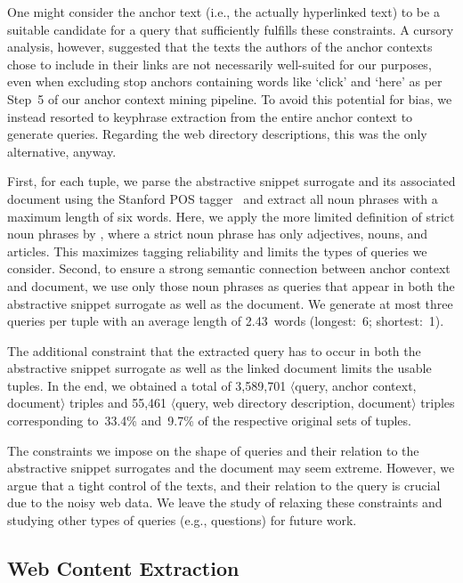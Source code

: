 \documentclass[sigconf]{acmart}
\begin{document}
One might consider the anchor text (i.e., the actually hyperlinked text) to be a suitable candidate for a query that sufficiently fulfills these constraints. A cursory analysis, however, suggested that the texts the authors of the anchor contexts chose to include in their links are not necessarily well-suited for our purposes, even when excluding stop anchors containing words like `click' and `here' as per Step~5 of our anchor context mining pipeline. To avoid this potential for bias, we instead resorted to keyphrase extraction from the entire anchor context to generate queries. Regarding the web directory descriptions, this was the only alternative, anyway.

First, for each tuple, we parse the abstractive snippet surrogate and its associated document using the Stanford POS tagger~\cite{toutanova:2003} and extract all noun phrases with a maximum length of six words. Here, we apply the more limited definition of strict noun phrases by \citet{hagen:2012}, where a strict noun phrase has only adjectives, nouns, and articles. This maximizes tagging reliability and limits the types of queries we consider. Second, to ensure a strong semantic connection between anchor context and document, we use only those noun phrases as queries that appear in both the abstractive snippet surrogate as well as the document. We generate at most three queries per tuple with an average length of 2.43~words (longest:~6; shortest:~1).

The additional constraint that the extracted query has to occur in both the abstractive snippet surrogate as well as the linked document limits the usable tuples. In the end, we obtained a total of 3,589,701 $\langle$query, anchor context, document$\rangle$ triples and 55,461 $\langle$query, web directory description, document$\rangle$ triples corresponding to~33.4\% and~9.7\% of the respective original sets of tuples.

The constraints we impose on the shape of queries and their relation to the abstractive snippet surrogates and the document may seem extreme. However, we argue that a tight control of the texts, and their relation to the query is crucial due to the noisy web data. We leave the study of relaxing these constraints and studying other types of queries (e.g., questions) for future work.

\subsection{Web Content Extraction}
\end{document}
